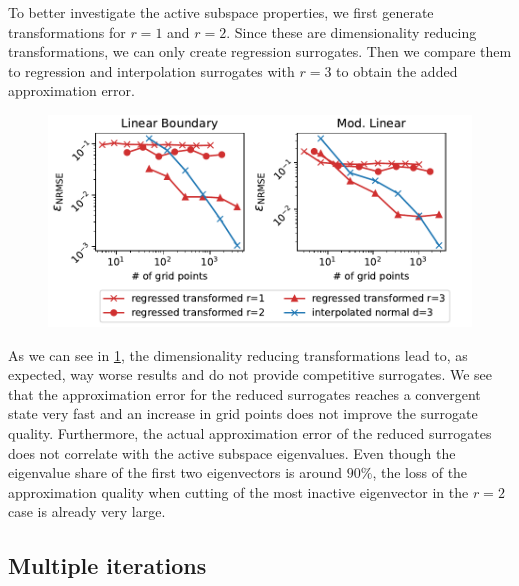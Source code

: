 \documentclass[
  a4paper,  %
  twoside,  %
  bibliography=totoc,
  headsepline,
  cleardoublepage=empty,
  parskip=half,
  draft=false
]{scrbook}
\begin{document}
To better investigate the active subspace properties, we first generate transformations for $r=1$ and $r=2$.
Since these are dimensionality reducing transformations, we can only create regression surrogates.
Then we compare them to regression and interpolation surrogates with $r=3$ to obtain the added approximation error.

\newpage
\begin{mdframed}[style=style]
\begin{figure}[H]
\includegraphics[width=\textwidth]{graphics/ishigami_red}\vspace{-2mm}
\delimit
{}
\label{fig:ishigami_red}
\end{figure}
\end{mdframed}
%
As we can see in \cref{fig:ishigami_red}, the dimensionality reducing transformations lead to, as expected, way worse results and do not provide competitive surrogates.
We see that the approximation error for the reduced surrogates reaches a convergent state very fast and an increase in grid points does not improve the surrogate quality.
Furthermore, the actual approximation error of the reduced surrogates does not correlate with the active subspace eigenvalues.
Even though the eigenvalue share of the first two eigenvectors is around $90\%$, the loss of the approximation quality when cutting of the most inactive eigenvector in the $r=2$ case is already very large.

\subsection{Multiple iterations}
\end{document}
